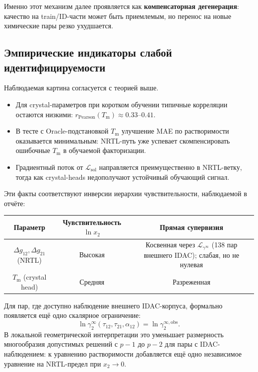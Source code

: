\documentclass[11pt]{article}
\begin{document}
Именно этот механизм далее проявляется как \textbf{компенсаторная дегенерация}: качество на train/ID-части может быть приемлемым, но перенос на новые химические пары резко ухудшается.

\subsection{Эмпирические индикаторы слабой идентифицируемости}

Наблюдаемая картина согласуется с теорией выше.

\begin{itemize}
  \item Для crystal-параметров при коротком обучении типичные корреляции остаются низкими: $r_{\mathrm{Pearson}}(T_{\mathrm{m}}) \approx 0.33$--$0.41$.
  \item В тесте с Oracle-подстановкой $T_{\mathrm{m}}$ улучшение MAE по растворимости оказывается минимальным: NRTL-путь уже успевает скомпенсировать ошибочные $T_{\mathrm{m}}$ в обучаемой факторизации.
  \item Градиентный поток от $\mathcal{L}_{\mathrm{sol}}$ направляется преимущественно в NRTL-ветку, тогда как crystal-heads недополучают устойчивый обучающий сигнал.
\end{itemize}

Эти факты соответствуют инверсии иерархии чувствительности, наблюдаемой в отчёте:

\begin{center}
\begin{tabular}{|c|c|c|}
\hline
Параметр & Чувствительность $\ln x_2$ & Прямая супервизия \\
\hline
$\Delta g_{12},\Delta g_{21}$ (NRTL) & Высокая & \shortstack[l]{Косвенная через $\mathcal{L}_{\gamma^\infty}$\\(138 пар внешнего IDAC); слабая, но не нулевая} \\
\hline
$T_{\mathrm{m}}$ (crystal head) & Средняя & Разреженная \\
\hline
\end{tabular}
\end{center}

Для пар, где доступно наблюдение внешнего IDAC-корпуса, формально появляется ещё одно скалярное ограничение:
\begin{equation*}
\ln\gamma_2^{\infty}(\tau_{12},\tau_{21},\alpha_{12}) = \ln\gamma_2^{\infty,\mathrm{obs}}.
\end{equation*}
В локальной геометрической интерпретации это уменьшает размерность многообразия допустимых решений с $p-1$ до $p-2$ для пары с IDAC-наблюдением: к уравнению растворимости добавляется ещё одно независимое уравнение на NRTL-предел при $x_2\to 0$.
\end{document}
